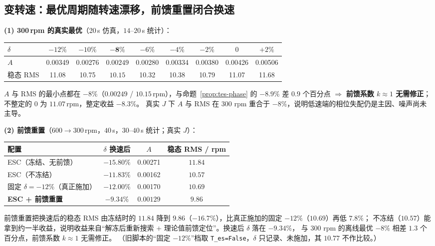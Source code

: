 \documentclass[11pt,a4paper]{article}
\theoremstyle{remark}\newtheorem{remark}{注}
\begin{document}
\subsection{变转速：最优周期随转速漂移，前馈重置闭合换速}\label{sec:tes-res-speed}
\textbf{(1) 300\,rpm 的真实最优}（20\,s 仿真，$14$--$20$\,s 统计）：
\begin{center}\footnotesize
\begin{tabular}{@{}lcccccccc@{}}
\toprule
$\delta$ & $-12\%$ & $-10\%$ & $\mathbf{-8\%}$ & $-6\%$ & $-4\%$ & $-2\%$ & $0$ & $+2\%$\\
\midrule
$A$ & 0.00349 & 0.00276 & $\mathbf{0.00249}$ & 0.00280 & 0.00334 & 0.00380 & 0.00426 & 0.00506\\
稳态 RMS & 11.08 & 10.75 & $\mathbf{10.15}$ & 10.32 & 10.38 & 10.79 & 11.07 & 11.68\\
\bottomrule
\end{tabular}
\end{center}
$A$ 与 RMS 的最小点都在 $-8\%$（$0.00249$ / $10.15$\,rpm），与命题~\ref{prop:tes-phase} 的 $-8.9\%$ 差 $0.9$ 个百分点
$\Rightarrow$ \textbf{前馈系数 $k\approx1$ 无需修正}；不整定的 $0$ 为 $11.07$\,rpm，整定收益 $-8.3\%$。
真实 $J$ 下 $A$ 与 RMS 在 300 rpm 重合于 $-8\%$，说明低速端的相位失配仍是主因、噪声尚未主导。

\textbf{(2) 前馈重置}（$600\to300$\,rpm，$40$\,s，$30$--$40$\,s 统计；真实 $J$）：
\begin{center}\footnotesize
\begin{tabular}{@{}lccc@{}}
\toprule
配置 & $\delta$ 换速后 & $A$ & 稳态 RMS / rpm\\
\midrule
ESC（冻结、无前馈） & $-15.80\%$ & 0.00271 & $11.84$\\
ESC（不冻结） & $-11.83\%$ & 0.00162 & $10.57$\\
固定 $\delta=-12\%$（真正施加） & $-12.00\%$ & 0.00170 & $10.69$\\
\textbf{ESC + 前馈重置} & $-9.34\%$ & $\mathbf{0.00129}$ & $\mathbf{9.86}$\\
\bottomrule
\end{tabular}
\end{center}
前馈重置把换速后的稳态 RMS 由冻结时的 $11.84$ 降到 $9.86$（$-16.7\%$），比真正施加的固定 $-12\%$（$10.69$）再低 $7.8\%$；
不冻结（$10.57$）能拿到约一半收益，说明收益来自“解冻后重新搜索 $+$ 理论值前馈定位”。换速后 $\delta$ 落在 $-9.34\%$，
与 300 rpm 的离线最优 $-8\%$ 相差 $1.3$ 个百分点，前馈系数 $k\approx1$ 无需修正。
（旧脚本的“固定 $-12\%$”档取 \texttt{T\_es=False}，$\delta$ 只记录、未施加，其 $10.77$ 不作比较。）
\end{document}
